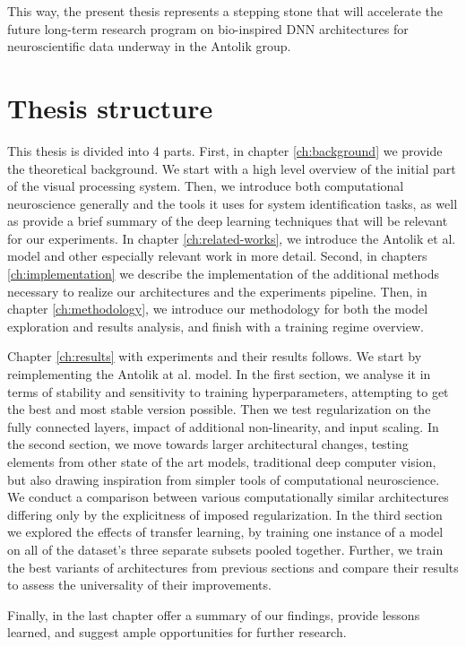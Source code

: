 This way, the present thesis represents a stepping stone that will accelerate the future long-term research program on bio-inspired DNN architectures for neuroscientific data underway in the Antolik group.

\section*{Thesis structure}
This thesis is divided into 4 parts. First, in chapter \ref{ch:background} we provide the theoretical background. We start with a high level overview of the initial part of the visual processing system. Then, we introduce both computational neuroscience generally and the tools it uses for system identification tasks, as well as provide a brief summary of the deep learning techniques that will be relevant for our experiments. In chapter \ref{ch:related-works}, we introduce the Antolik et al. model and other especially relevant work in more detail. Second, in chapters \ref{ch:implementation} we describe the implementation of the additional methods necessary to realize our architectures and the experiments pipeline. Then, in chapter \ref{ch:methodology}, we introduce our methodology for both the model exploration and results analysis, and finish with a training regime overview.

Chapter \ref{ch:results} with experiments and their results follows. We start by reimplementing the Antolik at al. model. In the first section, we analyse it in terms of stability and sensitivity to training hyperparameters, attempting to get the best and most stable version possible. Then we test regularization on the fully connected layers, impact of additional non-linearity, and input scaling. In the second section, we move towards larger architectural changes, testing elements from other state of the art models, traditional deep computer vision, but also drawing inspiration from simpler tools of computational neuroscience. We conduct a comparison between various computationally similar architectures differing only by the explicitness of imposed regularization. In the third section we explored the effects of transfer learning, by training one instance of a model on all of the dataset’s three separate subsets pooled together. Further, we train the best variants of architectures from previous sections and compare their results to assess the universality of their improvements.

Finally, in the last chapter offer a summary of our findings, provide lessons learned, and suggest ample opportunities for further research.